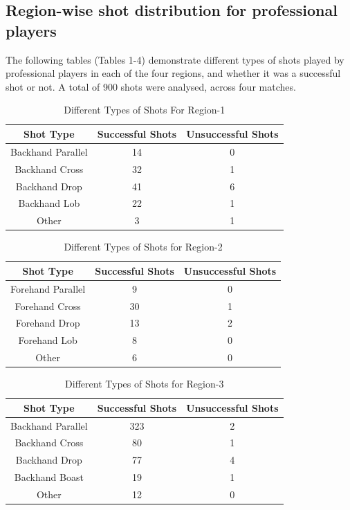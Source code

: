 \documentclass[10pt,conference]{IEEEtran}
\begin{document}
\subsection{Region-wise shot distribution for professional players}
The following tables (Tables 1-4) demonstrate different types of shots played by professional players in each of the four regions, and whether it was a successful shot or not. A total of 900 shots were analysed, across four matches.
\begin{table}[h!]
\centering
\begin{tabular}{||c c c||} 
 \hline
 Shot Type & Successful Shots & Unsuccessful Shots \\ [0.5ex]
 \hline\hline
 Backhand Parallel & 14 & 0  \\ 
 Backhand Cross & 32 & 1  \\
 Backhand Drop & 41 & 6  \\
 Backhand Lob & 22 & 1  \\
 Other & 3 & 1  \\ [1ex] 
 \hline
\end{tabular}
\caption{Different Types of Shots For Region-1}
\end{table}

\begin{table}[h!]
\centering
\begin{tabular}{||c c c||} 
 \hline
 Shot Type & Successful Shots & Unsuccessful Shots \\ [0.5ex]
 \hline\hline
 Forehand Parallel & 9 & 0  \\ 
 Forehand Cross & 30 & 1  \\
 Forehand Drop & 13 & 2  \\
 Forehand Lob & 8 & 0  \\
 Other & 6 & 0  \\ [1ex] 
 \hline
\end{tabular}
\caption{Different Types of Shots for Region-2}
\label{table:2}
\end{table}
\begin{table}[h!]
\centering
\begin{tabular}{||c c c||} 
 \hline
 Shot Type & Successful Shots & Unsuccessful Shots \\ [0.5ex]
 \hline\hline
 Backhand Parallel & 323 & 2  \\ 
 Backhand Cross & 80 & 1  \\
 Backhand Drop & 77 & 4  \\
 Backhand Boast & 19 & 1  \\
 Other & 12 & 0  \\ [1ex] 
 \hline
\end{tabular}
\caption{Different Types of Shots for Region-3}
\label{table:2}
\end{table}
\end{document}
